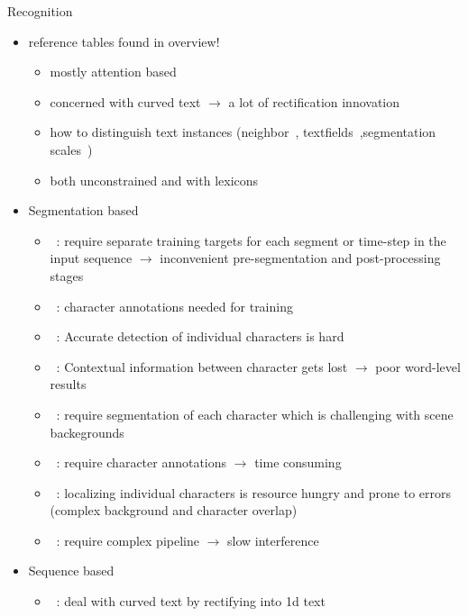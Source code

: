 Recognition
\begin{itemize}
    \item reference tables found in overview!
        \begin{itemize}
            \item mostly attention based
            \item concerned with curved text $\rightarrow$ a lot of rectification innovation
            \item how to distinguish text instances (neighbor~\citep{deng_pixellink_2018},
                textfields~\citep{xu_textfield_2019},segmentation scales~\citep{wang_shape_2019})
            \item both unconstrained and with lexicons
        \end{itemize}
    \item Segmentation based
        \begin{itemize}
            \item~\cite{xie_aggregation_2019}: require separate training targets for each segment
                or time-step in the input sequence $\rightarrow$ inconvenient pre-segmentation and
                post-processing stages
            \item~\cite{shi_end--end_2017}: character annotations needed for training
            \item~\citep{chen_text_2021}: Accurate detection of individual characters is hard
            \item~\citep{chen_text_2021}: Contextual information between character gets lost
                $\rightarrow$ poor word-level results
            \item~\cite{cheng_aon_2018}: require segmentation of each character which is challenging
                with scene backegrounds
            \item~\cite{cheng_aon_2018}: require character annotations $\rightarrow$ time consuming
            \item~\cite{zhan_esir_2019}: localizing individual characters is resource hungry and
                prone to errors (complex background and character overlap)
            \item~\cite{liu_abcnet_2020}: require complex pipeline $\rightarrow$ slow interference
        \end{itemize}
    \item Sequence based
        \begin{itemize}
            \item~\cite{li_show_2019}: deal with curved text by rectifying into 1d text

\end{itemize}
\end{itemize}
